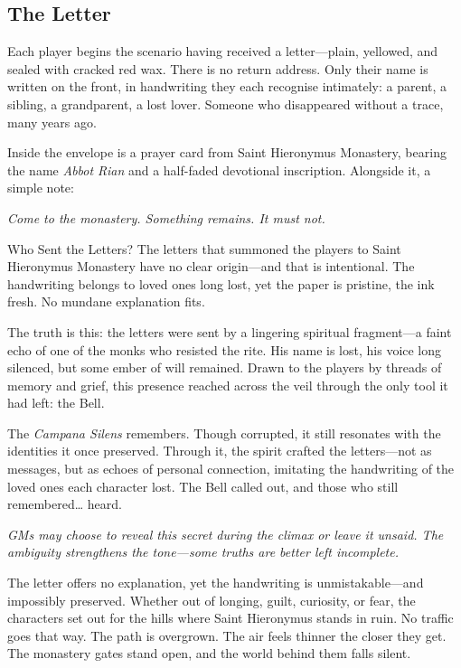 \documentclass[nodeprecatedcode,bg=print]{dndbook/dndbook}
\begin{document}
\subsection*{The Letter}

Each player begins the scenario having received a letter—plain, yellowed, and sealed with cracked red wax. There is no return address. Only their name is written on the front, in handwriting they each recognise intimately: a parent, a sibling, a grandparent, a lost lover. Someone who disappeared without a trace, many years ago.

Inside the envelope is a prayer card from Saint Hieronymus Monastery, bearing the name \emph{Abbot Rian} and a half-faded devotional inscription. Alongside it, a simple note:

\begin{WyrdExample}
   \textit{Come to the monastery. Something remains. It must not.}
\end{WyrdExample}
\begin{WyrdSidebar}[float=!b]{Who Sent the Letters?}
    The letters that summoned the players to Saint Hieronymus Monastery have no clear origin—and that is intentional. The handwriting belongs to loved ones long lost, yet the paper is pristine, the ink fresh. No mundane explanation fits.
    
    The truth is this: the letters were sent by a lingering spiritual fragment—a faint echo of one of the monks who resisted the rite. His name is lost, his voice long silenced, but some ember of will remained. Drawn to the players by threads of memory and grief, this presence reached across the veil through the only tool it had left: the Bell.
    
    The \emph{Campana Silens} remembers. Though corrupted, it still resonates with the identities it once preserved. Through it, the spirit crafted the letters—not as messages, but as echoes of personal connection, imitating the handwriting of the loved ones each character lost. The Bell called out, and those who still remembered… heard.
    
    \emph{GMs may choose to reveal this secret during the climax or leave it unsaid. The ambiguity strengthens the tone—some truths are better left incomplete.}
\end{WyrdSidebar}
    
The letter offers no explanation, yet the handwriting is unmistakable—and impossibly preserved. Whether out of longing, guilt, curiosity, or fear, the characters set out for the hills where Saint Hieronymus stands in ruin. No traffic goes that way. The path is overgrown. The air feels thinner the closer they get. The monastery gates stand open, and the world behind them falls silent.
\end{document}
